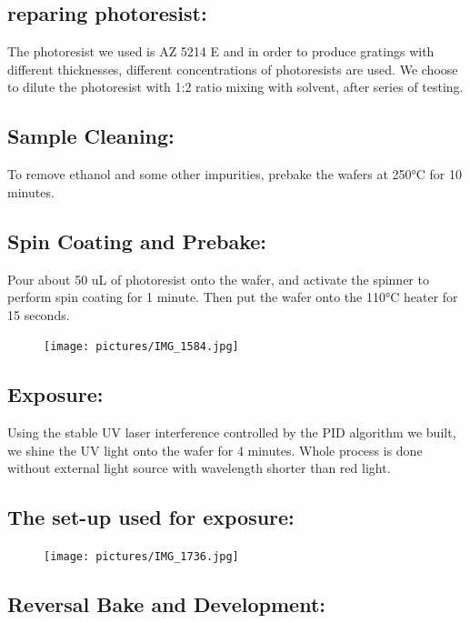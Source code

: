 \documentclass{article}
\begin{document}
\subsection{reparing photoresist:}

The photoresist we used is AZ 5214 E and in order to produce gratings with different thicknesses, different concentrations of photoresists are used. We choose to dilute the photoresist with 1:2 ratio mixing with solvent, after series of testing.


\subsection{Sample Cleaning:}

To remove ethanol and some other impurities, prebake the wafers at  250°C for 10 minutes.



\subsection{Spin Coating and Prebake:}

Pour about 50 uL of photoresist onto the wafer, and activate the spinner to perform spin coating for 1 minute. Then put the wafer onto the 110°C heater for 15 seconds.

\begin{figure}[H]
\centering
\texttt{[image: pictures/IMG\_1584.jpg]}
\end{figure}


\subsection{Exposure:}

Using the stable UV laser interference controlled by the PID algorithm we built, we shine the UV light onto the wafer for 4 minutes. Whole process is done without external light source with wavelength shorter than red light.

\subsection{The set-up used for exposure:}

\begin{figure}[H]
\centering
\texttt{[image: pictures/IMG\_1736.jpg]}
\end{figure}




\subsection{Reversal Bake and Development:}
\end{document}
